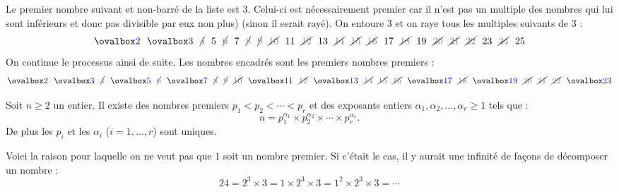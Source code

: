 Le premier nombre suivant et non-barré de la liste est $3$. Celui-ci est nécessairement premier car il n'est pas un multiple des nombres qui lui sont inférieurs et donc pas divisible par eux non plus) (sinon il serait rayé). On entoure $3$ et on raye tous les multiples suivants de $3$ :
$$\entourer{2}\ \ \entourer{3}\ \ \barrer{4}\ \ 5\ \ \barrer{6}\ \ 7\ \ \barrer{8}\ \ \barrer{9}\ \ \barrer{10}\ \ 11\ \ \barrer{12}\ \
13\ \ \barrer{14}\ \ \barrer{15}\ \
\barrer{16}\ \ 17\ \ \barrer{18}\ \ 19\ \ \barrer{20}\ \ \barrer{21}\ \ \barrer{22}\ \ 23\ \ \barrer{24}\ \ 25$$
On continue le processus ainsi de suite. Les nombres encadrés sont les premiers nombres premiers :
$$\entourer{2}\ \ \entourer{3}\ \ \barrer{4}\ \ \entourer{5}\ \ \barrer{6}\ \ \entourer{7}\ \ \barrer{8}\ \
\barrer{9}\ \ \barrer{10}\ \ \entourer{11}\ \ \barrer{12}\ \
\entourer{13}\ \ \barrer{14}\ \ \barrer{15}\ \
\barrer{16}\ \ \entourer{17}\ \ \barrer{18}\ \ \entourer{19}\ \ \barrer{20}\ \ \barrer{21}\ \ \barrer{22}\ \ \entourer{23}
$$

\clearpage

\begin{theoreme}\label{thm:TFA}
Soit $n \ge 2$ un entier. Il existe des nombres premiers $p_1 < p_2 < \cdots < p_r$
et des exposants entiers $\alpha_1, \alpha_2, \dots, \alpha_r \ge 1$ tels que :
$$n = p_1^{\alpha_1} \times p_2^{\alpha_2} \times \cdots \times p_r^{\alpha_r}.$$
De plus les $p_i$ et les $\alpha_i$ ($i=1,\ldots,r$) sont uniques.
\end{theoreme}


\vspace{5mm}
\begin{remarque}
Voici la raison pour laquelle on ne veut pas que $1$ soit un nombre premier. Si c'était le cas, il y aurait une infinité de façons de décomposer un nombre : $$24 = 2^3 \times 3 = 1 \times 2^3 \times 3 =
1^2 \times 2^3 \times 3 = \cdots$$
\end{remarque}



